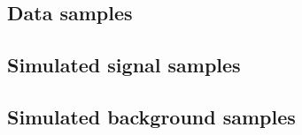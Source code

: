 \subsection{Data samples} \label{sec:Data}

\subsection{Simulated signal samples} \label{sec:SimSignal}

\subsection{Simulated background samples} \label{sec:SimBackground}